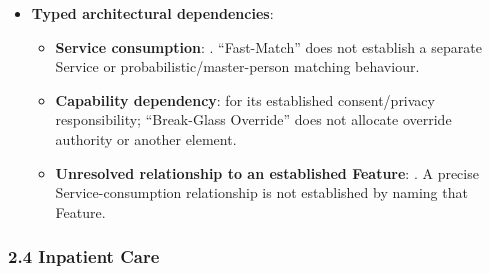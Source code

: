 \begin{itemize}
\begin{itemize}
\end{itemize}


\item
\textbf{Typed architectural dependencies}:


\begin{itemize}

\item
\textbf{Service consumption}: \texttt{}. “Fast-Match” does not establish a separate Service or probabilistic/\allowbreak{}master-person matching behaviour.



\item
\textbf{Capability dependency}: \texttt{} for its established consent/\allowbreak{}privacy responsibility; “Break-Glass Override” does not allocate override authority or another element.



\item
\textbf{Unresolved relationship to an established Feature}: \texttt{}. A precise Service-consumption relationship is not established by naming that Feature.



\end{itemize}


\end{itemize}
\label{rad:sd:105}

\par\smallskip
{}\label{rad:sd:107}



\label{rad:sd:109}
\subsubsection*{2.4 Inpatient Care}
\label{rad:sd:110}

